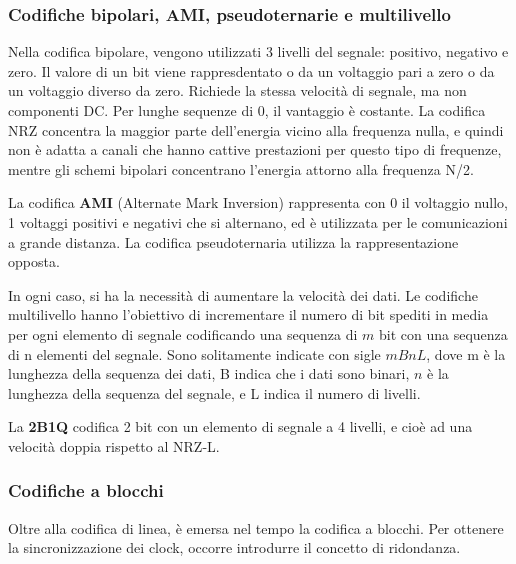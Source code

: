         \subsubsection{Codifiche bipolari, AMI, pseudoternarie e multilivello}
        
            Nella codifica bipolare, vengono utilizzati 3 livelli del segnale: positivo, negativo e zero. Il valore di un bit viene rappresdentato o da un voltaggio pari a zero o da un voltaggio diverso da zero. Richiede la stessa velocità di segnale, ma non componenti DC. Per lunghe sequenze di 0, il vantaggio è costante. La codifica NRZ concentra la maggior parte dell'energia vicino alla frequenza nulla, e quindi non è adatta a canali che hanno cattive prestazioni per questo tipo di frequenze, mentre gli schemi bipolari concentrano l'energia attorno alla frequenza N/2.
            
            \vspace{3mm}
            
            La codifica \textbf{AMI} (Alternate Mark Inversion) rappresenta con 0 il voltaggio nullo, 1 voltaggi positivi e negativi che si alternano, ed è utilizzata per le comunicazioni a grande distanza. La codifica pseudoternaria utilizza la rappresentazione opposta.
            
            \vspace{3mm}
            
            In ogni caso, si ha la necessità di aumentare la velocità dei dati. Le codifiche multilivello hanno l'obiettivo di incrementare il numero di bit spediti in media per ogni elemento di segnale codificando una sequenza di \(m\) bit con una sequenza di n elementi del segnale. Sono solitamente indicate con sigle \(mBnL\), dove m è la lunghezza della sequenza dei dati, B indica che i dati sono binari, \(n\) è la lunghezza della sequenza del segnale, e L indica il numero di livelli.
            
            La \textbf{2B1Q} codifica 2 bit con un elemento di segnale a 4 livelli, e cioè ad una velocità doppia rispetto al NRZ-L.
        
            \subsubsection{Codifiche a blocchi}
            
                Oltre alla codifica di linea, è emersa nel tempo la codifica a blocchi. Per ottenere la sincronizzazione dei clock, occorre introdurre il concetto di ridondanza. 
                
